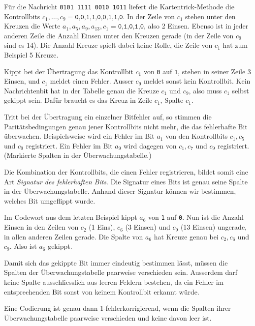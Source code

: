 \begin{myexample}
    Für die Nachricht \texttt{0101 1111 0010 1011} liefert die
    Kartentrick-Methode die Kontrollbits
    \(c_1,\ldots,c_9 = \texttt{0,0,1,1,0,0,1,1,0}\). In der Zeile von
    \(c_1\) stehen unter den Kreuzen die Werte
    \(a_1,a_5,a_9,a_{13},c_1 = \texttt{0,1,0,1,0}\), also 2 Einsen.
    Ebenso ist in jeder anderen Zeile die Anzahl Einsen unter den
    Kreuzen gerade (in der Zeile von \(c_9\) sind es 14).
    Die Anzahl Kreuze spielt dabei keine Rolle, die Zeile von \(c_1\)
    hat zum Beispiel 5 Kreuze.

    Kippt bei der Übertragung das Kontrollbit \(c_1\) von \texttt{0}
    auf \texttt{1}, stehen in seiner Zeile 3 Einsen, und \(c_1\) meldet
    einen Fehler. Ausser \(c_9\) meldet sonst kein Kontrollbit. Kein
    Nachrichtenbit hat in der Tabelle genau die Kreuze \(c_1\) und
    \(c_9\), also muss \(c_1\) selbst gekippt sein. Dafür braucht es das
    Kreuz in Zeile \(c_1\), Spalte \(c_1\).
\end{myexample}


Tritt bei der Übertragung ein einzelner Bitfehler auf, so stimmen
die Paritätsbedingungen genau jener Kontrollbits nicht mehr,
die das fehlerhafte Bit überwachen. Beispielsweise wird ein Fehler
im Bit \(a_1\) von den Kontrollbits \(c_1,c_5\) und \(c_9\)
registriert. Ein Fehler im Bit \(a_9\) wird dagegen von
\(c_1,c_7\) und \(c_9\) registriert. (Markierte Spalten in der Überwachungstabelle.)

Die Kombination der Kontrollbits, die einen Fehler registrieren,
bildet somit eine Art \emph{Signatur des fehlerhaften Bits}.
Die Signatur eines Bits ist genau seine Spalte in der
Überwachungstabelle. Anhand dieser Signatur können wir bestimmen,
welches Bit umgeflippt wurde.

\begin{myexample}
    Im Codewort aus dem letzten Beispiel kippt \(a_6\) von \texttt{1}
    auf \texttt{0}. Nun ist die Anzahl Einsen in den Zeilen von
    \(c_2\) (1 Eins), \(c_6\) (3 Einsen) und \(c_9\) (13 Einsen)
    ungerade, in allen anderen Zeilen gerade. Die Spalte von \(a_6\)
    hat Kreuze genau bei \(c_2,c_6\) und \(c_9\). Also ist \(a_6\)
    gekippt.
\end{myexample}

Damit sich das gekippte Bit immer eindeutig bestimmen lässt,
müssen die Spalten der Überwachungstabelle paarweise verschieden sein. Ausserdem darf
keine Spalte ausschliesslich aus leeren Feldern bestehen, da
ein Fehler im entsprechenden Bit sonst von keinem Kontrollbit
erkannt würde.
\begin{myremark}
    Eine Codierung ist genau dann 1-fehlerkorrigierend,
    wenn die Spalten ihrer Überwachungstabelle paarweise verschieden
    und keine davon leer ist.
\end{myremark}




